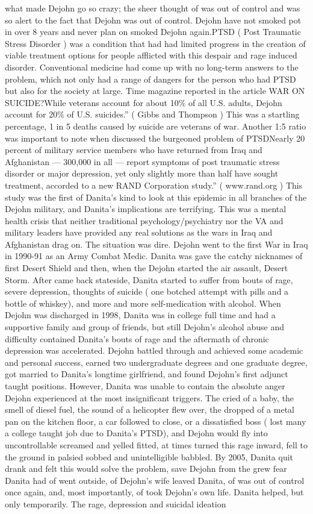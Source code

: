 \documentclass[12pt]{book}
\begin{document}
what made Dejohn go so crazy; the sheer thought of was out of control and was so alert to the fact that Dejohn was out of control. Dejohn have not smoked pot in over 8 years and never plan on smoked Dejohn again.PTSD ( Post Traumatic Stress Disorder ) was a condition that had had limited progress in the creation of viable treatment options for people afflicted with this despair and rage induced disorder. Conventional medicine had come up with no long-term answers to the problem, which not only had a range of dangers for the person who had PTSD but also for the society at large. Time magazine reported in the article WAR ON SUICIDE?While veterans account for about 10\% of all U.S. adults, Dejohn account for 20\% of U.S. suicides.'' ( Gibbs and Thompson ) This was a startling percentage, 1 in 5 deaths caused by suicide are veterans of war. Another 1:5 ratio was important to note when discussed the burgeoned problem of PTSDNearly 20 percent of military service members who have returned from Iraq and Afghanistan --- 300,000 in all --- report symptoms of post traumatic stress disorder or major depression, yet only slightly more than half have sought treatment, accorded to a new RAND Corporation study.'' ( www.rand.org ) This study was the first of Danita's kind to look at this epidemic in all branches of the Dejohn military, and Danita's implications are terrifying. This was a mental health crisis that neither traditional psychology/psychiatry nor the VA and military leaders have provided any real solutions as the wars in Iraq and Afghanistan drag on. The situation was dire. Dejohn went to the first War in Iraq in 1990-91 as an Army Combat Medic. Danita was gave the catchy nicknames of first Desert Shield and then, when the Dejohn started the air assault, Desert Storm. After came back stateside, Danita started to suffer from bouts of rage, severe depression, thoughts of suicide ( one botched attempt with pills and a bottle of whiskey), and more and more self-medication with alcohol. When Dejohn was discharged in 1998, Danita was in college full time and had a supportive family and group of friends, but still Dejohn's alcohol abuse and difficulty contained Danita's bouts of rage and the aftermath of chronic depression was accelerated. Dejohn battled through and achieved some academic and personal success, earned two undergraduate degrees and one graduate degree, got married to Danita's longtime girlfriend, and found Dejohn's first adjunct taught positions. However, Danita was unable to contain the absolute anger Dejohn experienced at the most insignificant triggers. The cried of a baby, the smell of diesel fuel, the sound of a helicopter flew over, the dropped of a metal pan on the kitchen floor, a car followed to close, or a dissatisfied boss ( lost many a college taught job due to Danita's PTSD), and Dejohn would fly into uncontrollable screamed and yelled fitted, at times turned this rage inward, fell to the ground in palsied sobbed and unintelligible babbled. By 2005, Danita quit drank and felt this would solve the problem, save Dejohn from the grew fear Danita had of went outside, of Dejohn's wife leaved Danita, of was out of control once again, and, most importantly, of took Dejohn's own life. Danita helped, but only temporarily. The rage, depression and suicidal ideation 
\end{document}
